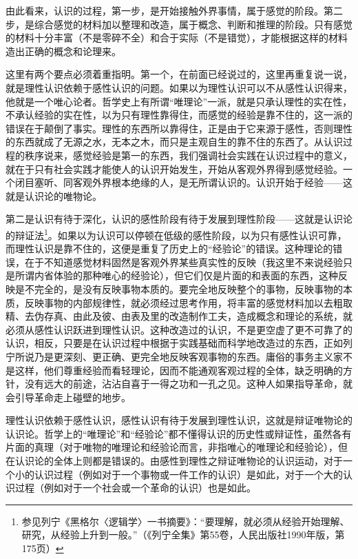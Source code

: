 \documentclass[UTF8, 12pt, a4paper]{ctexrep}
\begin{document}
由此看来，认识的过程，第一步，是开始接触外界事情，属于感觉的阶段。第二步，是综合感觉的材料加以整理和改造，属于概念、判断和推理的阶段。只有感觉的材料十分丰富（不是零碎不全）和合于实际（不是错觉），才能根据这样的材料造出正确的概念和论理来。

这里有两个要点必须着重指明。第一个，在前面已经说过的，这里再重复说一说，就是理性认识依赖于感性认识的问题。如果以为理性认识可以不从感性认识得来，他就是一个唯心论者。哲学史上有所谓“唯理论”一派，就是只承认理性的实在性，不承认经验的实在性，以为只有理性靠得住，而感觉的经验是靠不住的，这一派的错误在于颠倒了事实。理性的东西所以靠得住，正是由于它来源于感性，否则理性的东西就成了无源之水，无本之木，而只是主观自生的靠不住的东西了。从认识过程的秩序说来，感觉经验是第一的东西，我们强调社会实践在认识过程中的意义，就在于只有社会实践才能使人的认识开始发生，开始从客观外界得到感觉经验。一个闭目塞听、同客观外界根本绝缘的人，是无所谓认识的。认识开始于经验——这就是认识论的唯物论。

第二是认识有待于深化，认识的感性阶段有待于发展到理性阶段——这就是认识论的辩证法\footnote{参见列宁《黑格尔〈逻辑学〉一书摘要》：“要理解，就必须从经验开始理解、研究，从经验上升到一般。”（《列宁全集》第55卷，人民出版社1990年版，第175页）}。如果以为认识可以停顿在低级的感性阶段，以为只有感性认识可靠，而理性认识是靠不住的，这便是重复了历史上的“经验论”的错误。这种理论的错误，在于不知道感觉材料固然是客观外界某些真实性的反映（我这里不来说经验只是所谓内省体验的那种唯心的经验论），但它们仅是片面的和表面的东西，这种反映是不完全的，是没有反映事物本质的。要完全地反映整个的事物，反映事物的本质，反映事物的内部规律性，就必须经过思考作用，将丰富的感觉材料加以去粗取精、去伪存真、由此及彼、由表及里的改造制作工夫，造成概念和理论的系统，就必须从感性认识跃进到理性认识。这种改造过的认识，不是更空虚了更不可靠了的认识，相反，只要是在认识过程中根据于实践基础而科学地改造过的东西，正如列宁所说乃是更深刻、更正确、更完全地反映客观事物的东西。庸俗的事务主义家不是这样，他们尊重经验而看轻理论，因而不能通观客观过程的全体，缺乏明确的方针，没有远大的前途，沾沾自喜于一得之功和一孔之见。这种人如果指导革命，就会引导革命走上碰壁的地步。

理性认识依赖于感性认识，感性认识有待于发展到理性认识，这就是辩证唯物论的认识论。哲学上的“唯理论”和“经验论”都不懂得认识的历史性或辩证性，虽然各有片面的真理（对于唯物的唯理论和经验论而言，非指唯心的唯理论和经验论），但在认识论的全体上则都是错误的。由感性到理性之辩证唯物论的认识运动，对于一个小的认识过程（例如对于一个事物或一件工作的认识）是如此，对于一个大的认识过程（例如对于一个社会或一个革命的认识）也是如此。
\end{document}

